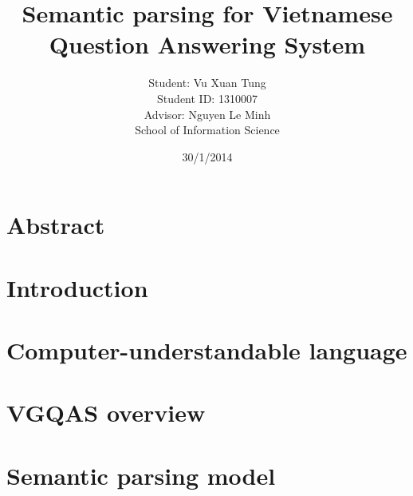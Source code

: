 \documentclass[11pt,twocolumn]{article}
\title{Semantic parsing for Vietnamese Question Answering System}
\author{Student: Vu Xuan Tung\\
Student ID: 1310007 \\
Advisor: Nguyen Le Minh \\
School of Information Science}
\date{30/1/2014}
\begin{document}
\maketitle

%

\section{Abstract}



\section{ Introduction}


\section{Computer-understandable language}


\section{VGQAS overview}


\section{Semantic parsing model}






\end{document}
